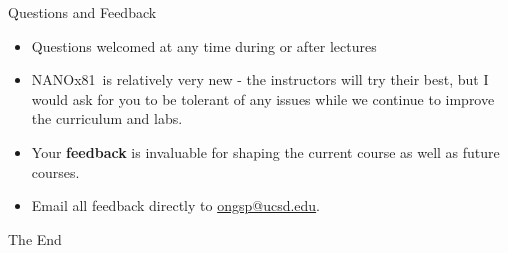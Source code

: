 \documentclass[aspectratio=169]{beamer}
\newcommand{\classname}{NANOx81}
\begin{document}
\begin{frame}{Questions and Feedback}
    \begin{itemize}
        \item Questions welcomed at any time during or after lectures
        \item \classname~is relatively very new - the instructors will try their best, but I would ask for you to be tolerant of any issues while we continue to improve the curriculum and labs.
        \item Your \textbf{feedback} is invaluable for shaping the current course as well as future courses. 
        \item Email all feedback directly to \href{mailto:ongsp@ucsd.edu}{ongsp@ucsd.edu}.
    \end{itemize}
\end{frame}


\begin{frame}
    \Huge{\centerline{The End}}
\end{frame}
\end{document}
